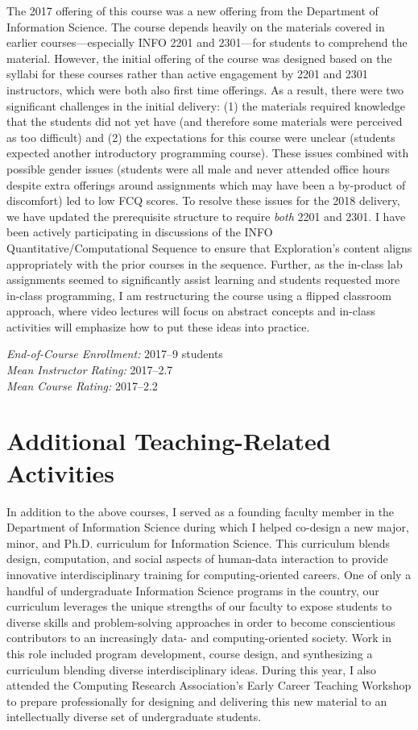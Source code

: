 \documentclass[11pt]{article}
\begin{document}
The 2017 offering of this course was a new offering from the Department of Information Science. The course depends heavily on the materials covered in earlier courses---especially INFO 2201 and 2301---for students to comprehend the material. However, the initial offering of the course was designed based on the syllabi for these courses rather than active engagement by 2201 and 2301 instructors, which were both also first time offerings. As a result, there were two significant challenges in the initial delivery: (1) the materials required knowledge that the students did not yet have (and therefore some materials were perceived as too difficult) and (2) the expectations for this course were unclear (students expected another introductory programming course). These issues combined with possible gender issues (students were all male and never attended office hours despite extra offerings around assignments which may have been a by-product of discomfort) led to low FCQ scores. To resolve these issues for the 2018 delivery, we have updated the prerequisite structure to require \emph{both} 2201 and 2301. I have been actively participating in discussions of the INFO Quantitative/Computational Sequence to ensure that Exploration's content aligns appropriately with the prior courses in the sequence. Further, as the in-class lab assignments seemed to significantly assist learning and students requested more in-class programming, I am restructuring the course using a flipped classroom approach, where video lectures will focus on abstract concepts and in-class activities will emphasize how to put these ideas into practice. 

\emph{End-of-Course Enrollment: }2017--9 students\\
\emph{Mean Instructor Rating:} 2017--2.7\\
\emph{Mean Course Rating:} 2017--2.2

\section*{Additional Teaching-Related Activities}

In addition to the above courses, I served as a founding faculty member in the Department of Information Science during which I helped co-design a new major, minor, and Ph.D. curriculum for Information Science. This curriculum blends design, computation, and social aspects of human-data interaction to provide innovative interdisciplinary training for computing-oriented careers.  One of only a handful of undergraduate Information Science programs in the country, our curriculum leverages the unique strengths of our faculty to expose students to diverse skills and problem-solving approaches in order to become conscientious contributors to an increasingly data- and computing-oriented society. Work in this role included program development, course design, and synthesizing a curriculum blending diverse interdisciplinary ideas. During this year, I also attended the Computing Research Association's Early Career Teaching Workshop to prepare professionally for designing and delivering this new material to an intellectually diverse set of undergraduate students. 
\end{document}
